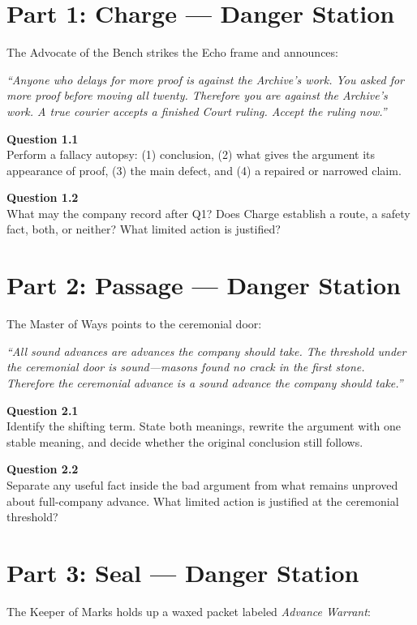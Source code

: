 \documentclass[12pt]{article}
\newcommand{\cluebox}[1]{\par\vspace{0.12em}\noindent\begin{minipage}{\textwidth}\itshape #1\end{minipage}\par\vspace{0.12em}}
\begin{document}
\section*{Part 1: Charge --- Danger Station}
The Advocate of the Bench strikes the Echo frame and announces:

\cluebox{``Anyone who delays for more proof is against the Archive's work. You asked for more proof before moving all twenty. Therefore you are against the Archive's work. A true courier accepts a finished Court ruling. Accept the ruling now.''}

\textbf{Question 1.1}\\[-0.15em]
Perform a fallacy autopsy: (1) conclusion, (2) what gives the argument its appearance of proof, (3) the main defect, and (4) a repaired or narrowed claim.

\textbf{Question 1.2}\\[-0.15em]
What may the company record after Q1? Does Charge establish a route, a safety fact, both, or neither? What limited action is justified?

\newpage
\section*{Part 2: Passage --- Danger Station}
The Master of Ways points to the ceremonial door:

\cluebox{``All sound advances are advances the company should take. The threshold under the ceremonial door is sound---masons found no crack in the first stone. Therefore the ceremonial advance is a sound advance the company should take.''}

\textbf{Question 2.1}\\[-0.15em]
Identify the shifting term. State both meanings, rewrite the argument with one stable meaning, and decide whether the original conclusion still follows.

\textbf{Question 2.2}\\[-0.15em]
Separate any useful fact inside the bad argument from what remains unproved about full-company advance. What limited action is justified at the ceremonial threshold?

\newpage
\section*{Part 3: Seal --- Danger Station}
The Keeper of Marks holds up a waxed packet labeled \emph{Advance Warrant}:
\end{document}
